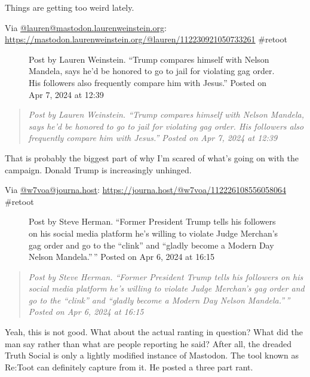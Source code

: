 Things are getting too weird lately.

Via
\href{https://mastodon.laurenweinstein.org/@lauren/}{@lauren@mastodon.laurenweinstein.org}:
\url{https://mastodon.laurenweinstein.org/@lauren/112230921050733261}
\#retoot

\begin{figure}
\centering
{}
\caption{Post by Lauren Weinstein. ``Trump compares himself with Nelson
Mandela, says he'd be honored to go to jail for violating gag order. His
followers also frequently compare him with Jesus.'' Posted on Apr 7,
2024 at 12:39}
\end{figure}

\begin{quote}
\emph{Post by Lauren Weinstein. ``Trump compares himself with Nelson
Mandela, says he'd be honored to go to jail for violating gag order. His
followers also frequently compare him with Jesus.'' Posted on Apr 7,
2024 at 12:39}
\end{quote}

That is probably the biggest part of why I'm scared of what's going on
with the campaign. Donald Trump is increasingly unhinged.

Via \href{https://journa.host/@w7voa/}{@w7voa@journa.host}:
\url{https://journa.host/@w7voa/112226108556058064} \#retoot

\begin{figure}
\centering
{}
\caption{Post by Steve Herman. ``Former President Trump tells his
followers on his social media platform he's willing to violate Judge
Merchan's gag order and go to the ``clink'' and ``gladly become a Modern
Day Nelson Mandela.''\,'' Posted on Apr 6, 2024 at 16:15}
\end{figure}

\begin{quote}
\emph{Post by Steve Herman. ``Former President Trump tells his followers
on his social media platform he's willing to violate Judge Merchan's gag
order and go to the ``clink'' and ``gladly become a Modern Day Nelson
Mandela.''\,'' Posted on Apr 6, 2024 at 16:15}
\end{quote}

Yeah, this is not good. What about the actual ranting in question? What
did the man say rather than what are people reporting he said? After
all, the dreaded Truth Social is only a lightly modified instance of
Mastodon. The tool known as Re:Toot can definitely capture from it. He
posted a three part rant.

